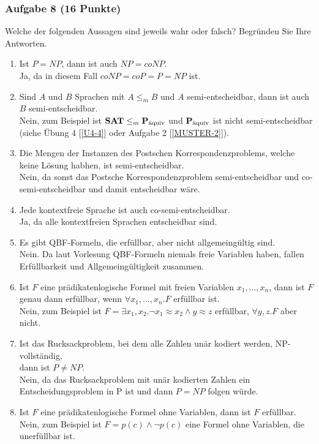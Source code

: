 \subsubsection*{Aufgabe 8 (16 Punkte)}
Welche der folgenden Aussagen sind jeweils wahr oder falsch? Begründen Sie Ihre Antworten.
\begin{enumerate}
\item Ist $P = NP$, dann ist auch $NP = coNP$. \\
\LOES Ja\POINT, da in diesem Fall $coNP = coP = P = NP$ ist.\POINT
\item Sind $A$ und $B$ Sprachen mit $A \leq_m B$ und $A$ semi-entscheidbar, dann ist auch $B$ semi-entscheidbar. \\
\LOES Nein\POINT, zum Beispiel ist $\prob{SAT} \leq_m \paq$ und $\paq$ ist nicht semi-entscheidbar (siehe Übung 4 [\ref{U4-4}] oder Aufgabe 2 [\ref{MUSTER-2}]).\POINT
\item Die Mengen der Instanzen des Postschen Korrespondenzproblems, welche keine Lösung habhen, ist semi-entscheidbar. \\
\LOES Nein\POINT, da sonst das Postsche Korrespondenzproblem semi-entscheidbar und co-semi-entscheidbar und damit entscheidbar wäre.\POINT
\item Jede kontextfreie Sprache ist auch co-semi-entscheidbar. \\
\LOES Ja\POINT, da alle kontextfreien Sprachen entscheidbar sind.\POINT
\item Es gibt QBF-Formeln, die erfüllbar, aber nicht allgemeingültig sind. \\
\LOES Nein\POINT. Da laut Vorlesung QBF-Formeln niemals freie Variablen haben, fallen Erfüllbarkeit und Allgemeingültigkeit zusammen.\POINT
\item Ist $F$ eine prädikatenlogische Formel mit freien Variablen $x_1,\dots,x_n$, dann ist $F$ genau dann erfüllbar, wenn $\forall x_1,\dots,x_n.F$ erfüllbar ist. \\
\LOES Nein\POINT, zum Beispiel ist $F = \exists x_1, x_2.\neg x_1 \approx x_2 \land y \approx z$ erfüllbar, $\forall y,z.F$ aber nicht.\POINT
\item Ist das Rucksackproblem, bei dem alle Zahlen unär kodiert werden, NP-vollständig,\\
dann ist $P \not= NP$. \\
\LOES Nein\POINT, da das Rucksackproblem mit unär kodierten Zahlen ein Entscheidungsproblem in P ist und dann $P = NP$ folgen würde.\POINT
\item Ist $F$ eine prädikatenlogische Formel ohne Variablen, dann ist $F$ erfüllbar. \\
\LOES Nein\POINT, zum Beispiel ist $F = p(c) \land \neg p(c)$ eine Formel ohne Variablen, die unerfüllbar ist.\POINT
\end{enumerate}